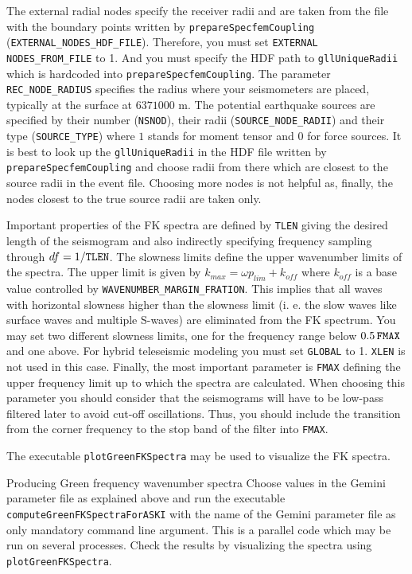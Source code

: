  The external radial nodes specify the receiver radii and are taken from the file with the boundary points written by \verb+prepareSpecfemCoupling+ (\verb+EXTERNAL_NODES_HDF_FILE+). Therefore, you must set \verb+EXTERNAL NODES_FROM_FILE+ to 1. And you must specify the HDF path to \verb+gllUniqueRadii+ which is hardcoded into \verb+prepareSpecfemCoupling+. The parameter \verb+REC_NODE_RADIUS+ specifies the radius where your seismometers are placed, typically at the surface at $6371000$ m. The potential earthquake sources are specified by their number (\verb+NSNOD+), their radii (\verb+SOURCE_NODE_RADII+) and their type (\verb+SOURCE_TYPE+) where $1$ stands for moment tensor and $0$ for force sources. It is best to look up the \verb+gllUniqueRadii+ in the HDF file written by \verb+prepareSpecfemCoupling+ and choose radii from there which are closest to the source radii in the event file. Choosing more nodes is not helpful as, finally, the nodes closest to the true source radii are taken only.

 Important properties of the FK spectra are defined by \verb+TLEN+ giving the desired length of the seismogram and also indirectly specifying frequency sampling through $df = 1/\verb+TLEN+$. The slowness limits define the upper wavenumber limits of the spectra. The upper limit is given by $k_{max} = \omega p_{lim}+k_{off}$ where $k_{off}$ is a base value controlled by \verb+WAVENUMBER_MARGIN_FRATION+. This implies that all waves with horizontal slowness higher than the slowness limit (i. e. the slow waves like surface waves and multiple S-waves) are eliminated from the FK spectrum. You may set two different slowness limits, one for the frequency range below $0.5\,\verb+FMAX+$ and one above. For hybrid teleseismic modeling you must set \verb+GLOBAL+ to 1. \verb+XLEN+ is not used in this case. Finally, the most important parameter is \verb+FMAX+ defining the upper frequency limit up to which the spectra are calculated. When choosing this parameter you should consider that the seismograms will have to be low-pass filtered later to avoid cut-off oscillations. Thus, you should include the transition from the corner frequency to the stop band of the filter into \verb+FMAX+.

 The executable \verb+plotGreenFKSpectra+ may be used to visualize the FK spectra.
%
\begin{actionbox}[label={action:green-fkspectra},float=h!]{Producing Green frequency wavenumber spectra}
   Choose values in the Gemini parameter file as explained above and run the executable \verb+computeGreenFKSpectraForASKI+ with the name of the Gemini parameter file as only mandatory command line argument. This is a parallel code which may be run on several processes. Check the results by visualizing the spectra using \verb+plotGreenFKSpectra+.
\end{actionbox}
%
